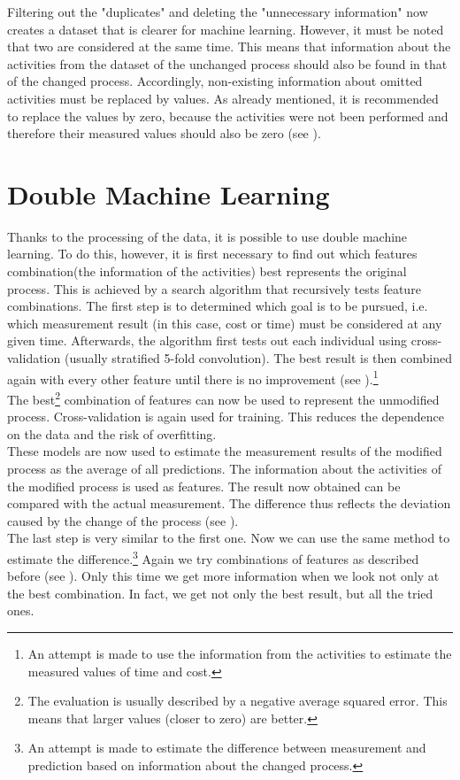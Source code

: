     Filtering out the "duplicates" and deleting the "unnecessary information" now creates a dataset that is clearer for machine learning. However, it must be noted that two are considered at the same time. This means that information about the activities from the dataset of the unchanged process should also be found in that of the changed process. Accordingly, non-existing information about omitted activities must be replaced by values. As already mentioned, it is recommended to replace the values by zero, because the activities were not been performed and therefore their measured values should also be zero (see ).

    \section{Double Machine Learning}
    Thanks to the processing of the data, it is possible to use double machine learning. To do this, however, it is first necessary to find out which features combination(the information of the activities) best represents the original process. This is achieved by a search algorithm that recursively tests feature combinations. The first step is to determined which goal is to be pursued, i.e. which measurement result (in this case, cost or time) must be considered at any given time. Afterwards, the algorithm first tests out each individual using cross-validation (usually stratified 5-fold convolution). The best result is then combined again with every other feature until there is no improvement (see ).\footnote{An attempt is made to use the information from the activities to estimate the measured values of time and cost.}\\
    The best\footnote{The evaluation is usually described by a negative average squared error. This means that larger values (closer to zero) are better.} combination of features can now be used to represent the unmodified process. Cross-validation is again used for training. This reduces the dependence on the data and the risk of overfitting.\\
    These models are now used to estimate the measurement results of the modified process as the average of all predictions. The information about the activities of the modified process is used as features. The result now obtained can be compared with the actual measurement. The difference thus reflects the deviation caused by the change of the process (see ).\\
    The last step is very similar to the first one. Now we can use the same method to estimate the difference.\footnote{An attempt is made to estimate the difference between measurement and prediction based on information about the changed process.} Again we try combinations of features as described before (see ). Only this time we get more information when we look not only at the best combination. In fact, we get not only the best result, but all the tried ones.\\
